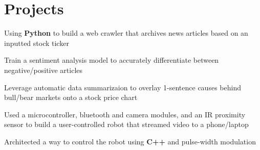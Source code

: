 \documentclass[letterpaper]{deedy-resume} %
\begin{document}
\begin{minipage}[t]{0.66\textwidth}

  \section{Projects}
%  
%  
%

  \begin{tightitemize}
  \item Using \textbf{Python} to build a web crawler that archives news articles based on an inputted stock ticker
  \item Train a sentiment analysis model to accurately differentiate between negative/positive articles
  \item Leverage automatic data summarizaion to overlay 1-sentence causes behind bull/bear markets onto a stock price chart
  \end{tightitemize}


  \begin{tightitemize}
  \item Used a microcontroller, bluetooth and camera modules, and an IR proximity sensor to build a user-controlled robot that streamed video to a phone/laptop
  \item Architected a way to control the robot using \textbf{C++} and pulse-width modulation
  \end{tightitemize}
  
%
%

\end{minipage} %
\end{document}
